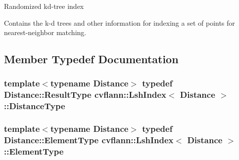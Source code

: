 Randomized kd-\/tree index

Contains the k-\/d trees and other information for indexing a set of points for nearest-\/neighbor matching. 

\subsection{Member Typedef Documentation}
\hypertarget{classcvflann_1_1LshIndex_aed0c5e217eff759f37ef2b91a9ddaae6}{
\subsubsection[{Distance\-Type}]{\setlength{\rightskip}{0pt plus 5cm}template$<$typename Distance$>$ typedef Distance\-::\-Result\-Type {\bf cvflann\-::\-Lsh\-Index}$<$ Distance $>$\-::{\bf Distance\-Type}}}\label{classcvflann_1_1LshIndex_aed0c5e217eff759f37ef2b91a9ddaae6}
\hypertarget{classcvflann_1_1LshIndex_a2f042ae6416a2a78d1d9a7f622d1e284}{
\subsubsection[{Element\-Type}]{\setlength{\rightskip}{0pt plus 5cm}template$<$typename Distance$>$ typedef Distance\-::\-Element\-Type {\bf cvflann\-::\-Lsh\-Index}$<$ Distance $>$\-::{\bf Element\-Type}}}\label{classcvflann_1_1LshIndex_a2f042ae6416a2a78d1d9a7f622d1e284}


